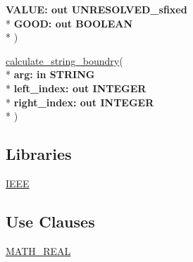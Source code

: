 \begin{DoxyCompactItemize}
  {\bfseries \textcolor{vhdlchar}{ }\textcolor{vhdlchar}{V\+A\+L\+U\+E\+: }\textcolor{stringliteral}{} {\bfseries \textcolor{keywordflow}{out}\textcolor{vhdlchar}{ }\textcolor{vhdlchar}{U\+N\+R\+E\+S\+O\+L\+V\+E\+D\+\_\+sfixed}\textcolor{vhdlchar}{ }}}\\*
  {\bfseries \textcolor{vhdlchar}{ }\textcolor{vhdlchar}{G\+O\+O\+D\+: }\textcolor{stringliteral}{} {\bfseries \textcolor{keywordflow}{out}\textcolor{vhdlchar}{ }\textcolor{comment}{B\+O\+O\+L\+E\+A\+N}\textcolor{vhdlchar}{ }}}\\*
   )
\item 
{\bfseries {\bfseries \textcolor{vhdlchar}{ }}} \hyperlink{class__fixed__pkg_ad4f73e7adf38861b239276668d4f5ebc}{calculate\+\_\+string\+\_\+boundry}( \\*
{\bfseries \textcolor{vhdlchar}{ }\textcolor{vhdlchar}{arg\+: }\textcolor{stringliteral}{} {\bfseries \textcolor{keywordflow}{in}\textcolor{vhdlchar}{ }\textcolor{comment}{S\+T\+R\+I\+N\+G}\textcolor{vhdlchar}{ }}}\\*
  {\bfseries \textcolor{vhdlchar}{ }\textcolor{vhdlchar}{left\+\_\+index\+: }\textcolor{stringliteral}{} {\bfseries \textcolor{keywordflow}{out}\textcolor{vhdlchar}{ }\textcolor{comment}{I\+N\+T\+E\+G\+E\+R}\textcolor{vhdlchar}{ }}}\\*
  {\bfseries \textcolor{vhdlchar}{ }\textcolor{vhdlchar}{right\+\_\+index\+: }\textcolor{stringliteral}{} {\bfseries \textcolor{keywordflow}{out}\textcolor{vhdlchar}{ }\textcolor{comment}{I\+N\+T\+E\+G\+E\+R}\textcolor{vhdlchar}{ }}}\\*
   )
\end{DoxyCompactItemize}
\subsection*{Libraries}
 \begin{DoxyCompactItemize}
\item 
\hyperlink{class__fixed__pkg_ae4f03c286607f3181e16b9aa12d0c6d4}{I\+E\+E\+E} 
\end{DoxyCompactItemize}
\subsection*{Use Clauses}
 \begin{DoxyCompactItemize}
\item 
\hyperlink{class__fixed__pkg_a6af860958a1bb510ee63ced87b57e11a}{M\+A\+T\+H\+\_\+\+R\+E\+A\+L}   
\end{DoxyCompactItemize}
